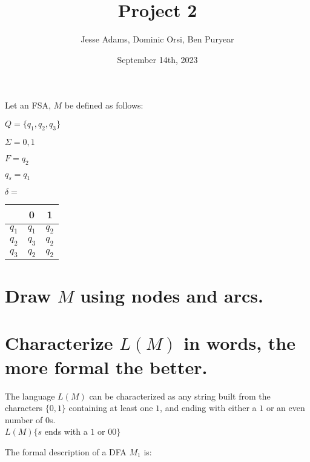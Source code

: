 \documentclass{article}
\title{Project 2}
\author{Jesse Adams, Dominic Orsi, Ben Puryear}
\date{September 14th, 2023}
\begin{document}
\maketitle

Let an FSA, $M$ be defined as follows:

$Q = \{q_1, q_2, q_3\}$

$\Sigma = {0,1}$

$F = {q_2}$

$q_s = q_1$


$\delta = $
\begin{tabular}{ |c|c|c| }
          & 0     & 1     \\
    \hline
    $q_1$ & $q_1$ & $q_2$ \\
    $q_2$ & $q_3$ & $q_2$ \\
    $q_3$ & $q_2$ & $q_2$ \\
\end{tabular}


\section{Draw $M$ using nodes and arcs.}

\section{Characterize $L(M)$ in words, the more formal the better.}

The language $L(M)$ can be characterized as any string built from the characters $\{0, 1\}$ containing at least one $1$, and ending with either a $1$ or an even number of $0$s. \\
$L(M)\{s$ ends with a $1$ or $00\}$
\newpage

The formal description of a DFA $M_1$ is:
\end{document}
